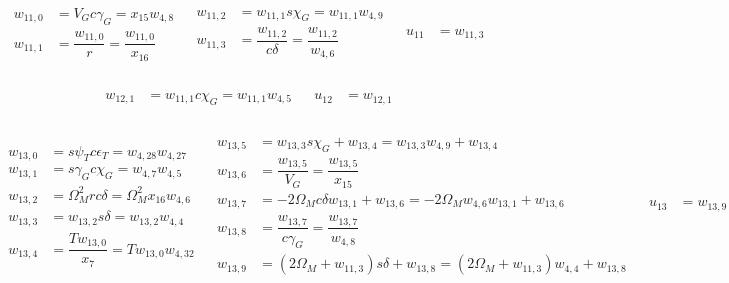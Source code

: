\begin{align} \label{eq:auxF11}
\begin{split}
w_{11,0} &= V_{G}c\gamma_{G} = x_{15}w_{4,8} \\
w_{11,1} &= \dfrac{w_{11,0}}{r} = \dfrac{w_{11,0}}{x_{16}} \\
\end{split}
&
\begin{split}
w_{11,2} &= w_{11,1}s\chi_{G} = w_{11,1}w_{4,9} \\
w_{11,3} &= \dfrac{w_{11,2}}{c\delta} = \dfrac{w_{11,2}}{w_{4,6}} \\
\end{split}
&
\begin{split}
u_{11} &= w_{11,3} \\
\end{split}
\end{align}

\begin{align} \label{eq:auxF12}
\begin{split}
w_{12,1} &= w_{11,1}c\chi_{G} = w_{11,1}w_{4,5} \\
\end{split}
&
\begin{split}
u_{12} &= w_{12,1} \\
\end{split}
\end{align}

\begin{align} \label{eq:auxF13}
\begin{split}
w_{13,0} &= s\psi_{T} c\epsilon_{T} = w_{4,28}w_{4,27} \\
w_{13,1} &= s\gamma_{G} c\chi_{G} = w_{4,7}w_{4,5} \\
w_{13,2} &= \Omega_{M}^{2} r c\delta = \Omega_{M}^{2} x_{16} w_{4,6} \\
w_{13,3} &= w_{13,2} s\delta = w_{13,2}w_{4,4} \\
w_{13,4} &= \dfrac{T w_{13,0}}{x_{7}} = T w_{13,0} w_{4,32} \\
\end{split}
&
\begin{split}
w_{13,5} &= w_{13,3} s\chi_{G}+w_{13,4} = w_{13,3}w_{4,9}+w_{13,4} \\
w_{13,6} &= \dfrac{w_{13,5}}{V_{G}} = \dfrac{w_{13,5}}{x_{15}} \\
w_{13,7} &= -2\Omega_{M} c\delta w_{13,1}+w_{13,6} = -2\Omega_{M}w_{4,6}w_{13,1}+w_{13,6} \\
w_{13,8} &= \dfrac{w_{13,7}}{c\gamma_{G}} = \dfrac{w_{13,7}}{w_{4,8}} \\
w_{13,9} &= \left(2\Omega_{M}+w_{11,3} \right) s\delta+w_{13,8} = \left(2\Omega_{M}+w_{11,3} \right)w_{4,4}+w_{13,8} \\
\end{split}
&
\begin{split}
u_{13} &= w_{13,9} \\
\end{split}
\end{align}

